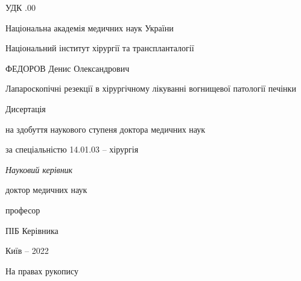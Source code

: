 \thispagestyle{empty}

УДК .00

 \begin{centering}
  \linespread{1.1}
  \vspace{2em}

{Національна академія медичних наук України

Національний інститут хірургії та транспланталогії}

  \vspace{5em}

ФЕДОРОВ Денис Олександрович

  \vspace{2em}

Лапароскопічні резекції в хірургічному лікуванні вогнищевої патології печінки

  \vspace{5em}


Дисертація 

на здобуття наукового ступеня доктора медичних наук

за спеціальністю 14.01.03 -- хірургія


  \vspace{2em}

\textit{Науковий керівник}

доктор медичних наук

професор

ПІБ Керівника

\vspace{11em}

  Київ -- 2022

 \end{centering}
\begin{flushright}
 На правах рукопису
\end{flushright} 
